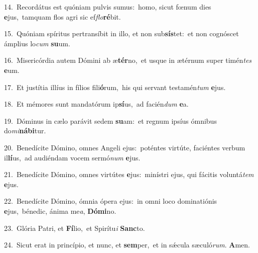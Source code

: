 {\numbfont\textcolor{\numbcolor}{14.}}~Recordátus est quóniam pulvis sumus:~\dagger homo, sicut fœnum dies \textbf{e}\-jus,~\star tamquam flos agri sic ef\-\textit{flo}\-\textbf{ré}bit.\par
{\numbfont\textcolor{\numbcolor}{15.}}~Quóniam spíritus pertransíbit in illo, et non sub\-\textbf{sís}\-tet:~\star et non cognóscet ámplius lo\textit{cum} \textbf{su}\-um.\par
{\numbfont\textcolor{\numbcolor}{16.}}~Misericórdia autem Dómini ab æ\-\textbf{tér}\-no,~\star et usque in ætérnum super timén\textit{tes} \textbf{e}\-um.\par
{\numbfont\textcolor{\numbcolor}{17.}}~Et justítia illíus in fílios fili\-\textbf{ó}\-rum,~\star his qui servant testamén\textit{tum} \textbf{e}\-jus.\par
{\numbfont\textcolor{\numbcolor}{18.}}~Et mémores sunt mandatórum ip\-\textbf{sí}\-us,~\star ad facién\textit{dum} \textbf{e}\-a.\par
{\numbfont\textcolor{\numbcolor}{19.}}~Dóminus in cælo parávit sedem \textbf{su}\-am:~\star et regnum ipsíus ómnibus do\-\textit{mi}\-\textbf{ná}\textbf{bi}tur.\par
{\numbfont\textcolor{\numbcolor}{20.}}~Benedícite Dómino, omnes Angeli ejus:~\dagger poténtes virtúte, faciéntes verbum il\-\textbf{lí}\-us,~\star ad audiéndam vocem sermó\textit{num} \textbf{e}\-jus.\par
{\numbfont\textcolor{\numbcolor}{21.}}~Benedícite Dómino, omnes virtútes \textbf{e}\-jus:~\star minístri ejus, qui fácitis voluntá\textit{tem} \textbf{e}\-jus.\par
{\numbfont\textcolor{\numbcolor}{22.}}~Benedícite Dómino, ómnia ópera ejus:~\dagger in omni loco dominatiónis \textbf{e}\-jus,~\star bénedic, ánima me\-\textit{a}\-, \textbf{Dó}\-\textbf{mi}no.\par
{\numbfont\textcolor{\numbcolor}{23.}}~Glória Patri, et \textbf{Fí}\-lio,~\star et Spirítu\textit{i} \textbf{Sanc}\-to.\par
{\numbfont\textcolor{\numbcolor}{24.}}~Sicut erat in princípio, et nunc, et \textbf{sem}\-per,~\star et in sǽcula sæculó\-\textit{rum}\-. \textbf{A}\-men.\par
